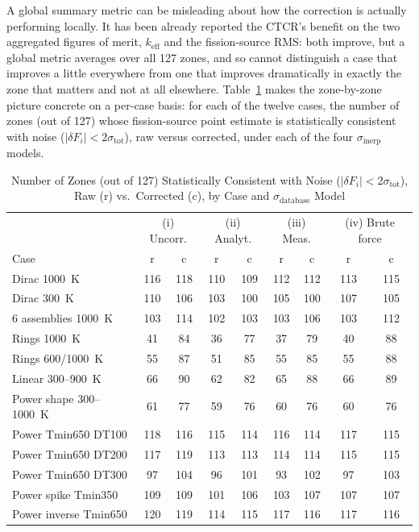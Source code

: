 \documentclass{style/nseJournal}
\begin{document}
A global summary metric can be misleading about how the correction is actually performing locally. It has been already reported the CTCR's benefit on the two aggregated figures of merit, $k_{\text{eff}}$ and the fission-source RMS: both improve, but a global metric averages over all 127 zones, and so cannot distinguish a case that improves a little everywhere from one that improves dramatically in exactly the zone that matters and not at all elsewhere. Table~\ref{tab:hexcount} makes the zone-by-zone picture concrete on a per-case basis: for each of the twelve cases, the number of zones (out of 127) whose fission-source point estimate is statistically consistent with noise ($|\delta F_i|<2\sigma_{\text{tot}}$), raw versus corrected, under each of the four $\sigma_{\text{inerp}}$ models.

\begin{table}[h]
\centering
\caption{Number of Zones (out of 127) Statistically Consistent with Noise ($|\delta F_i|<2\sigma_{\text{tot}}$), Raw (r) vs.\ Corrected (c), by Case and $\sigma_{\text{database}}$ Model}
\label{tab:hexcount}
\footnotesize
\begin{tabular}{lcccccccc}
\hline
 & \multicolumn{2}{c}{(i) Uncorr.} & \multicolumn{2}{c}{(ii) Analyt.} & \multicolumn{2}{c}{(iii) Meas.} & \multicolumn{2}{c}{(iv) Brute force} \\
Case & r & c & r & c & r & c & r & c \\ \hline
Dirac 1000~K            & 116 & 118 & 110 & 109 & 112 & 112 & 113 & 115 \\
Dirac 300~K              & 110 & 106 & 103 & 100 & 105 & 100 & 107 & 105 \\
6 assemblies 1000~K      & 103 & 114 & 102 & 103 & 103 & 106 & 103 & 112 \\
Rings 1000~K             &  41 &  84 &  36 &  77 &  37 &  79 &  40 &  88 \\
Rings 600/1000~K         &  55 &  87 &  51 &  85 &  55 &  85 &  55 &  88 \\
Linear 300--900~K        &  66 &  90 &  62 &  82 &  65 &  88 &  66 &  89 \\
Power shape 300--1000~K  &  61 &  77 &  59 &  76 &  60 &  76 &  60 &  76 \\
Power Tmin650 DT100      & 118 & 116 & 115 & 114 & 116 & 114 & 117 & 115 \\
Power Tmin650 DT200      & 117 & 119 & 113 & 113 & 114 & 114 & 115 & 115 \\
Power Tmin650 DT300      &  97 & 104 &  96 & 101 &  93 & 102 &  97 & 103 \\
Power spike Tmin350      & 109 & 109 & 101 & 106 & 103 & 107 & 107 & 107 \\
Power inverse Tmin650    & 120 & 119 & 114 & 115 & 117 & 116 & 117 & 116 \\ \hline
\end{tabular}
\end{table}
\end{document}
